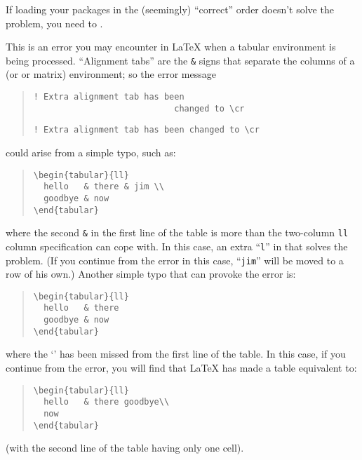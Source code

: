 {If loading your packages in the (seemingly) ``correct'' order doesn't
solve the problem, you need to .


This is an error you may encounter in \LaTeX{} when a tabular
environment is being processed.  ``Alignment tabs'' are the
\texttt{\&} signs that separate the columns of a 
(or  or matrix) environment; so the error message
\begin{quote}
\begin{narrowversion}
\begin{verbatim}
! Extra alignment tab has been 
                            changed to \cr
\end{verbatim}
\end{narrowversion}
\begin{wideversion}
\begin{verbatim}
! Extra alignment tab has been changed to \cr
\end{verbatim}
\end{wideversion}
\end{quote}
could arise from a simple typo, such as:
\begin{quote}
\begin{verbatim}
\begin{tabular}{ll}
  hello   & there & jim \\
  goodbye & now
\end{tabular}
\end{verbatim}
\end{quote}
where the second \texttt{\&} in the first line of the table is more than the
two-column \texttt{ll} column specification can cope with. In this
case, an extra ``\texttt{l}'' in that solves the problem.  (If you
continue from the error in this case, ``\texttt{jim}'' will be moved
to a row of his own.)  Another simple typo that can provoke the error
is:
\begin{quote}
\begin{verbatim}
\begin{tabular}{ll}
  hello   & there
  goodbye & now
\end{tabular}
\end{verbatim}
\end{quote}
where the `\texttt{\bsbs }' has been missed from the first line of the table.
In this case, if you continue from the error, you will find that
\LaTeX{} has made a table equivalent to:
\begin{quote}
\begin{verbatim}
\begin{tabular}{ll}
  hello   & there goodbye\\
  now
\end{tabular}
\end{verbatim}
\end{quote}
(with the second line of the table having only one cell).

}
